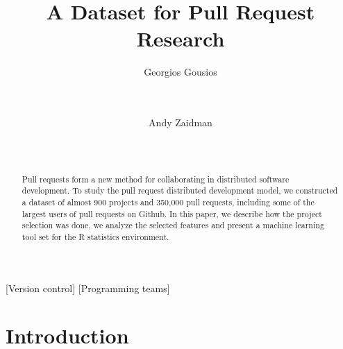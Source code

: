 \documentclass{sig-alternate}
\begin{document}
\newcommand{\todo}[1]{\textbf{TODO}\footnote{\textbf{TODO:} #1}}

\newcommand{\ghtorrent}{\textsc{ght}orrent\xspace}
\newcommand{\api}{\textsc{api}\xspace}
\newcommand{\pullreqs}{\textsf{pullreqs}\xspace}

\title{A Dataset for Pull Request Research}

\author{
\alignauthor
Georgios Gousios\\
       \\
       \\
\and
Andy Zaidman\\
       \\
       \\
}

\maketitle

\begin{abstract}

Pull requests form a new method for collaborating in distributed software
development. To study the pull request distributed development model, we
constructed a dataset of almost 900 projects and 350,000 pull requests, 
including some of the largest
users of pull requests on Github. In this paper, we describe how the project
selection was done, we analyze the selected features and present a machine
learning tool set for the R statistics environment. 

\end{abstract}

[Version control]
[Programming teams]



\section{Introduction}
\label{sec:intro}
\end{document}
